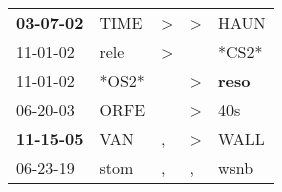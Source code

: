 \begin{supertabular}{p{0.07\textwidth}p{0.06\textwidth}p{0.02\textwidth}p{0.02\textwidth}p{0.06\textwidth}}
 \textbf{03-07-02\textsuperscript{}} &  TIME\textsuperscript{} &  \textgreater &  \textgreater &           HAUN\textsuperscript{} \\
          11-01-02\textsuperscript{} &  rele\textsuperscript{} &  \textgreater &               &                            *CS2* \\
          11-01-02\textsuperscript{} &                   *OS2* &               &  \textgreater &  \textbf{reso\textsuperscript{}} \\
          06-20-03\textsuperscript{} &  ORFE\textsuperscript{} &               &  \textgreater &            40s\textsuperscript{} \\
 \textbf{11-15-05\textsuperscript{}} &   VAN\textsuperscript{} &             , &  \textgreater &           WALL\textsuperscript{} \\
          06-23-19\textsuperscript{} &  stom\textsuperscript{} &             , &             , &           wsnb\textsuperscript{} \\
\end{supertabular}
